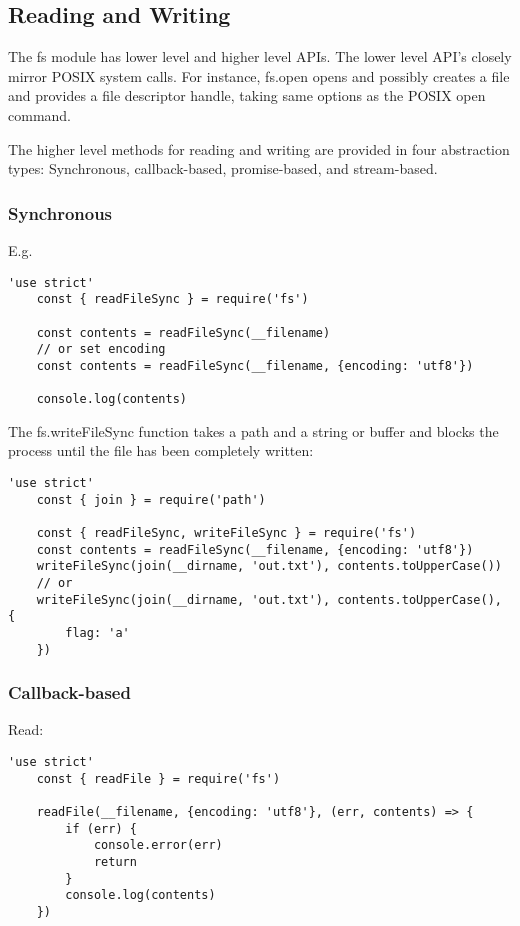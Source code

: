 \documentclass{scrartcl}
\begin{document}
\subsection{Reading and Writing}

The fs module has lower level and higher level APIs. The lower level API's closely mirror POSIX system calls. For instance, fs.open opens and possibly creates a file and provides a file descriptor handle, taking same options as the POSIX open command.

The higher level methods for reading and writing are provided in four abstraction types: Synchronous, callback-based, promise-based, and stream-based.

\subsubsection{Synchronous}

E.g.

\begin{lstlisting}[style=ES6]
    'use strict'
    const { readFileSync } = require('fs')

    const contents = readFileSync(__filename)
    // or set encoding
    const contents = readFileSync(__filename, {encoding: 'utf8'})

    console.log(contents)
\end{lstlisting}

The fs.writeFileSync function takes a path and a string or buffer and blocks the process until the file has been completely written:

\begin{lstlisting}[style=ES6]
    'use strict'
    const { join } = require('path')

    const { readFileSync, writeFileSync } = require('fs')
    const contents = readFileSync(__filename, {encoding: 'utf8'})
    writeFileSync(join(__dirname, 'out.txt'), contents.toUpperCase())
    // or
    writeFileSync(join(__dirname, 'out.txt'), contents.toUpperCase(), {
        flag: 'a'
    })

\end{lstlisting}

\subsubsection{Callback-based}

Read:

\begin{lstlisting}[style=ES6]
    'use strict'
    const { readFile } = require('fs')

    readFile(__filename, {encoding: 'utf8'}, (err, contents) => {
        if (err) {
            console.error(err)
            return
        }
        console.log(contents)
    })
\end{lstlisting}
\end{document}
